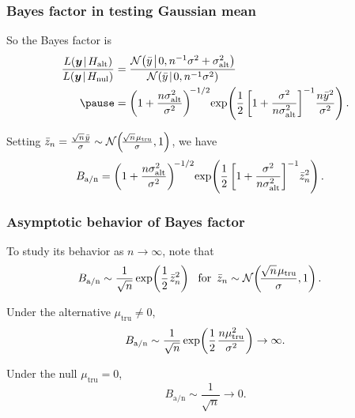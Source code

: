 \documentclass[18pt]{beamer}
\newcommand{\defineTightSpacing}{%
	\setlength{\abovedisplayskip}{.25\baselineskip}%
	\setlength{\belowdisplayskip}{.25\baselineskip}%
}
\newcommand{\given}{\mskip.7\thinmuskip | \mskip.7\thinmuskip}
\newcommand{\midGiven}{\mskip.7\thinmuskip \middle| \mskip.7\thinmuskip}
\newcommand{\thinnerspace}{\mskip.5\thinmuskip}
\newcommand{\normalDist}{\operatorname{\mathcal{N}}}
\newcommand{\truthSub}{\mathrm{tru}}
\newcommand{\likelihood}{L}
\newcommand{\by}{\bm{y}}
\newcommand{\hypothesis}{H}
\newcommand{\nullSub}{\mathrm{nul}}
\newcommand{\altSub}{\mathrm{alt}}
\newcommand{\bayesFacAlt}{B_{\mathrm{a} / \mathrm{n}}}
\begin{document}
\begin{frame}
\frametitle{Bayes factor in testing Gaussian mean}

So the Bayes factor is
\begin{equation*} \defineTightSpacing%
\begin{aligned}
\frac{%
	\likelihood(\by \given \hypothesis_\altSub)%
}{%
	\likelihood(\by \given \hypothesis_\nullSub) 
}
	&= \frac{
		\normalDist\!\left(
			\bar{y} \midGiven 0, n^{-1} \sigma^2 + \sigma_\altSub^2
		\right)
	}{
		\normalDist\!\left(
			\bar{y} \midGiven 0, n^{-1} \sigma^2
		\right)
	} \\
	\pause
	&= \left( 1 + \frac{n \sigma_\altSub^2}{\sigma^2} \right)^{\!-1/2} \!
	\exp\!\left(
		\frac{1}{2} 
		\left[ 1 + \frac{\sigma^2}{n \sigma_\altSub^2} \right]^{-1} \!
		\frac{n \bar{y}^2}{\sigma^2}
	\right).
\end{aligned}
\end{equation*}

\pause
Setting $\bar{z}_n = \frac{\sqrt{n} \thinnerspace \bar{y}}{\sigma} \sim \normalDist\!\left(\! \frac{\sqrt{n} \thinnerspace \mu_\truthSub}{\sigma}, 1 \right)$, we have
\begin{equation*} \defineTightSpacing%
\begin{aligned}
\bayesFacAlt
	&= \left( 1 + \frac{n \sigma_\altSub^2}{\sigma^2} \right)^{\!-1/2} \!
	\exp\!\left(
		\frac{1}{2} 
		\left[ 1 + \frac{\sigma^2}{n \sigma_\altSub^2} \right]^{-1} \!
		\bar{z}_n^2
	\right).
\end{aligned}
\end{equation*}
\end{frame}


\begin{frame}
\frametitle{Asymptotic behavior of Bayes factor}
\pause
To study its behavior as $n \to \infty$, note that
\begin{equation*} \defineTightSpacing%
\begin{aligned}
\bayesFacAlt
	&\sim \frac{1}{\sqrt{n}} 
	\exp\!\left(
		\frac{1}{2} \thinnerspace \bar{z}_n^2
	\right)
	\ \text{ for } \,
	\bar{z}_n \sim \normalDist\!\left(\! \frac{\sqrt{n} \thinnerspace \mu_\truthSub}{\sigma}, 1 \right).
\end{aligned}
\end{equation*}

\pause
\medskip
Under the alternative $\mu_\truthSub \neq 0$, 
$$\displaystyle 
\bayesFacAlt
	\sim \frac{1}{\sqrt{n}} 
	\exp\!\left(
		\frac{1}{2} \thinnerspace \frac{n \mu_\truthSub^2}{\sigma^2}
	\right) \to \infty.$$

\pause
Under the null $\mu_\truthSub = 0$,
$$\displaystyle
\bayesFacAlt \sim \frac{1}{\sqrt{n}} \to 0.$$
\end{frame}
\end{document}

